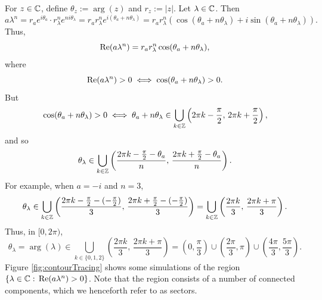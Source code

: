 \documentclass[12pt, oneside, a4paper]{article}
\begin{document}
For $z\in\mathbb C$, define $\theta_z:=\arg(z)$ and $r_z:=|z|$.
Let $\lambda\in\mathbb C$. Then
\[a\lambda^n = r_ae^{i\theta_a}\cdot r_\lambda^n e^{ni\theta_\lambda} = r_a r_\lambda^n e^{i(\theta_a+n\theta_\lambda)} = r_ar_\lambda^n(\cos(\theta_a+n\theta_\lambda) + i\sin(\theta_a+n\theta_\lambda)).\]
Thus,
\[\mathrm{Re}(a\lambda^n) = r_ar_\lambda^n \cos(\theta_a+n\theta_\lambda),\]
where
\[\mathrm{Re}(a\lambda^n)>0 \iff \cos(\theta_a+n\theta_\lambda)>0.\]
But
\[\cos(\theta_a+n\theta_\lambda)>0 \iff \theta_a+n\theta_\lambda\in \bigcup_{k\in\mathbb Z}\left(2\pi k -\frac{\pi}{2},\,2\pi k + \frac{\pi}{2}\right),\]
and so
\[\theta_\lambda\in \bigcup_{k\in\mathbb Z}\left(\frac{2\pi k -\frac{\pi}{2}-\theta_a}{n},\,\frac{2\pi k + \frac{\pi}{2}-\theta_a}{n}\right).\]
For example, when $a=-i$ and $n=3$,
\[\theta_\lambda\in \bigcup_{k\in\mathbb Z}\left(\frac{2\pi k -\frac{\pi}{2}-(-\frac{\pi}{2})}{3},\,\frac{2\pi k + \frac{\pi}{2}-(-\frac{\pi}{2})}{3}\right) = \bigcup_{k\in\mathbb Z}\left(\frac{2\pi k}{3},\,\frac{2\pi k + \pi}{3}\right).\]
Thus, in $[0,2\pi)$,
\[\theta_\lambda=\arg(\lambda)\in \bigcup_{k\in\{0,1,2\}}\left(\frac{2\pi k}{3},\,\frac{2\pi k + \pi}{3}\right) = \left(0,\frac{\pi}{3}\right)\cup \left(\frac{2\pi}{3}, \pi\right)\cup \left(\frac{4\pi}{3}, \frac{5\pi}{3}\right).\]
Figure \ref{fig:contourTracing} shows some simulations of the region $\{\lambda\in\mathbb C:\,\mathrm{Re}(a\lambda^n)>0\}$. Note that the region consists of a number of connected components, which we henceforth refer to as sectors.
\end{document}
